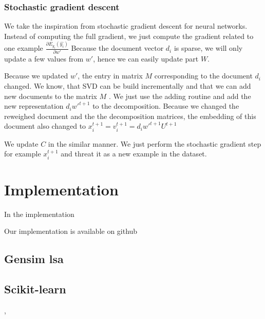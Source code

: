     
    \subsubsection{Stochastic gradient descent}
    
    We take the inspiration from stochastic gradient descent for neural networks.
    Instead of computing the full gradient, we just compute the gradient related to one example $\frac{\partial E_{y_i}(\hat{y_i})}{\partial w'}$
    Because the document vector $d_i$ is sparse, we will only update a few values from $w'$, 
    hence we can easily update part $W$.

    Because we updated $w'$, the entry in matrix $M$ corresponding to the document $d_i$ changed.
    We know, that SVD can be build incrementally and that we can add new documents to the matrix $M$ \cite{brand2006fast}.
    We just use the adding routine and add the new representation $d_i w'^{t+1}$ to the decomposition.
    Because we changed the reweighed document and the the decomposition matrices,
    the embedding of this document also changed to 
    $x_i^{t+1} = v_i^{t+1} = d_i w'^{t+1} U^{t+1}$
    
    We update $C$ in the similar manner.
    We just perform the stochastic gradient step for example $x_i^{t+1}$ and threat it as a new example in the dataset.
    
    \section{Implementation}
        
        In the implementation
        \cite{bird2009natural} %
        \cite{oliphant2006guide} %
        
        Our implementation is available on github \*%
        
        \subsection{Gensim lsa}
        \cite{rehurek_lrec}
        \* %
        \* %
        \* %
        
        \subsection{Scikit-learn}
        \cite{sklearn_api},
        \cite{scikit-learn}
        \* %
        \* %
        

